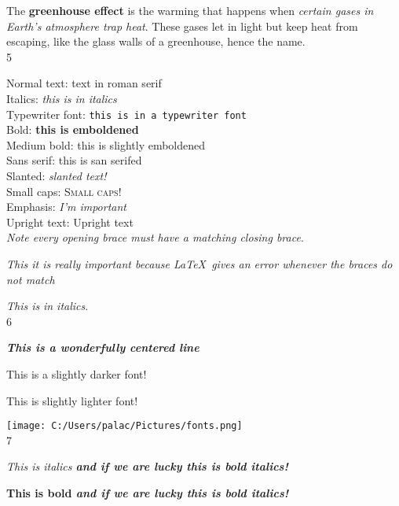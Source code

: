 \documentclass{article} %
\begin{document}
The \textbf{greenhouse effect} is the warming that happens when 
\textit{certain gases in Earth's atmosphere trap heat}. These 
gases let in light but keep heat from escaping, like the glass 
walls of a greenhouse, hence the name.\\

5

Normal text: \textrm{text in roman serif}\\  
Italics: \textit{this is in italics}\\
Typewriter font: \texttt{this is in a typewriter font}\\
Bold: \textbf{this is emboldened}\\
Medium bold: \textmd{this is slightly emboldened}\\
Sans serif: \textsf{this is san serifed}\\
Slanted: \textsl{slanted text!}\\
Small caps: \textsc{Small caps!}\\
Emphasis: \emph{I'm important}\\
Upright text: \textup{Upright text}\\


\textit{Note every \emph{opening brace} must have a matching
\emph{closing brace}}.

\emph{This it is \emph{really important} because \LaTeX\ 
gives an error whenever the braces do not match}

\textit{This is }\emph{in italics}.\\

6

\begin{center}\bfseries\itshape
This is a wonderfully centered line
\end{center}

\begin{sffamily}
This is a slightly darker font!
\end{sffamily}

\begin{itshape}
This is slightly lighter font!
\end{itshape}


\texttt{[image: C:/Users/palac/Pictures/fonts.png]}\\

7

{\it This is italics {\bf and if we are lucky this is bold italics!}}

{\bf This is bold {\it and if we are lucky this is bold italics!}}
\end{document}
